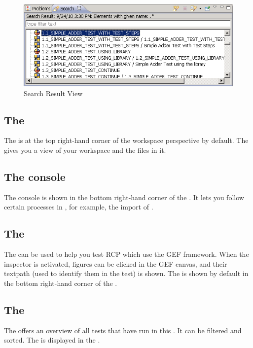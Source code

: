 \begin{figure}[hbtp]
\begin{center}
\includegraphics{Userinterface/Editors/PS/showresultview}
\caption{Search Result View}
\label{showresultview}
\end{center}
\end{figure}

\subsection{The \gdnavview{}}
\protect{}
The \gdnavview{} is at the top right-hand corner of the workspace perspective by default. The \gdnavview{} gives you a view of your workspace and the files in it. 


\subsection{The console}
The console is shown in the bottom right-hand corner of the \specpersp{}. It lets you follow certain processes in \app{}, for example, the import of \gdprojects{}.  

\subsection{The \gdinspector{}}
The \gdinspector{} can be used to help you test RCP \gdauts{} which use the GEF framework. When the inspector is activated, figures can be clicked in the GEF canvas, and their textpath (used to identify them in the test) is shown. The \gdinspector{} is shown by default in the bottom right-hand corner of the \specpersp{}. 

\subsection{The \gdtestsummaryview{}}
The \gdtestsummaryview{} offers an overview of all tests that have run in this \gddb{}. It can be filtered and sorted.  The \gdtestsummaryview{} is displayed in the \reportpersp{}. 

